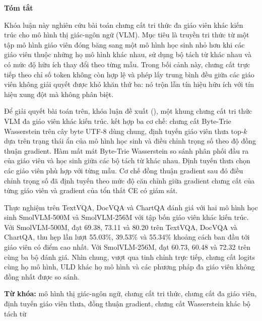 \begin{center}
\textbf{\large{Tóm tắt}}
\end{center}


\begin{small}

Khóa luận này nghiên cứu bài toán chưng cất tri thức đa giáo viên khác kiến trúc cho mô hình thị giác-ngôn ngữ (VLM). Mục tiêu là truyền tri thức từ một
tập mô hình giáo viên đóng băng sang một mô hình học sinh nhỏ hơn khi các giáo
viên thuộc những họ mô hình khác nhau, sử dụng bộ tách từ khác nhau và có mức
độ hữu ích thay đổi theo từng mẫu. Trong bối cảnh này, chưng cất trực tiếp theo
chỉ số token không còn hợp lệ và phép lấy trung bình đều giữa các giáo viên
không giải quyết được khó khăn thứ ba: nó trộn lẫn tín hiệu hữu ích với tín
hiệu xung đột mà không phân biệt.


Để giải quyết bài toán trên, khóa luận đề xuất \methodfull{}
(\methodname{}), một khung chưng cất tri thức VLM đa giáo viên khác kiến trúc.
\methodname{} kết hợp ba cơ chế: chưng cất Byte-Trie Wasserstein trên cây byte
UTF-8 dùng chung, định tuyến giáo viên thưa top-$k$ dựa trên trạng thái ẩn của
mô hình học sinh và điều chỉnh trọng số theo độ đồng thuận gradient. Hàm mất
mát Byte-Trie Wasserstein so sánh phân phối đầu ra của giáo viên và học sinh
giữa các bộ tách từ khác nhau. Định tuyến thưa chọn các giáo viên phù hợp với
từng mẫu. Cơ chế đồng thuận gradient sau đó điều chỉnh trọng số đã định tuyến
theo mức độ căn chỉnh giữa gradient chưng cất của từng giáo viên và gradient
của tổn thất CE có giám sát.


Thực nghiệm trên TextVQA, DocVQA và ChartQA đánh giá \methodname{} với hai mô
hình học sinh SmolVLM-500M và SmolVLM-256M với tập bốn giáo viên khác kiến trúc.
Với SmolVLM-500M, \methodname{} đạt 69.38, 73.11 và 80.20 trên TextVQA,
DocVQA và ChartQA, thu hẹp lần lượt 55.03\%, 39.53\% và 55.34\% khoảng cách
ban đầu tới giáo viên có điểm cao nhất. Với SmolVLM-256M, \methodname{} đạt
60.73, 60.48 và 72.32 trên cùng ba bộ đánh giá. Nhìn chung, \methodname{}
vượt qua tinh chỉnh trực tiếp, chưng cất logits cùng họ mô hình, ULD khác họ
mô hình và các phương pháp đa giáo viên không đồng nhất được so sánh.

\vspace*{1cm}
\textbf{Từ khóa:} mô hình thị giác-ngôn ngữ, chưng cất tri thức, chưng cất đa
giáo viên, định tuyến giáo viên thưa, đồng thuận gradient, chưng cất
Wasserstein khác bộ tách từ

\end{small}
